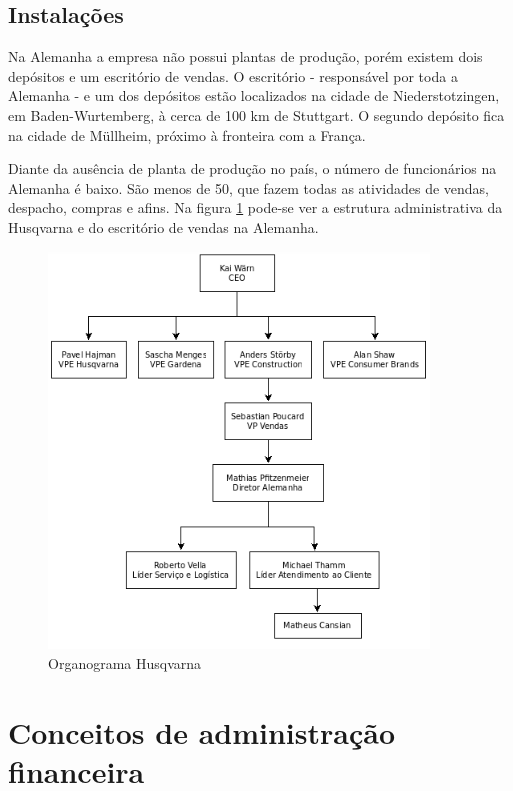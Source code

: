 \documentclass[12pt]{article}
\begin{document}
\subsection{Instalações}
	
	Na Alemanha a empresa não possui plantas de produção, porém existem dois depósitos e um escritório de vendas. O escritório - responsável por toda a Alemanha - e um dos depósitos estão localizados na cidade de Niederstotzingen, em Baden-Wurtemberg, à cerca de 100 km de Stuttgart. O segundo depósito fica na cidade de Müllheim, próximo à fronteira com a França.

	Diante da ausência de planta de produção no país, o número de funcionários na Alemanha é baixo. São menos de 50, que fazem todas as atividades de vendas, despacho, compras e afins. Na figura \ref{fig:organograma} pode-se ver a estrutura administrativa da Husqvarna e do escritório de vendas na Alemanha.

\begin{figure}[h!]
	\centering
	\includegraphics[width=0.9\textwidth]{img/organograma-matheus.png}
	\caption{Organograma Husqvarna}
	\label{fig:organograma}
\end{figure}

\clearpage

\section{Conceitos de administração financeira}
\end{document}
